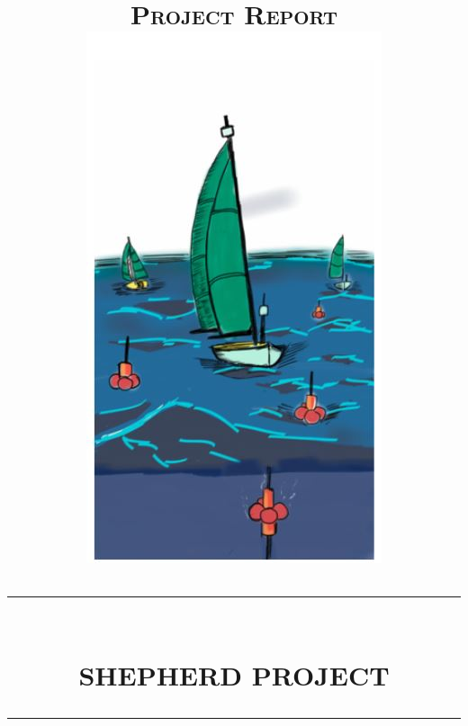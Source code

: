 \documentclass[a4paper]{report}
\begin{document}
\newcommand{\HRule}{\rule{\linewidth}{0.5mm}}

\begin{titlepage}
    \title{ \normalsize \textsc{Project Report} 
    		\\ [0.5cm]
            \includegraphics[scale=0.6]{image/logo_SHEPHERD.JPG} %
            \\ [0.3cm]
            \HRule{} 
            \\ [0.5cm]
            \LARGE \textbf{\uppercase{SHEPHERD Project}} 
            \\ [0.20cm]
            \HRule{} 
            \\ [1.0cm]
}
\end{titlepage}
\end{document}
